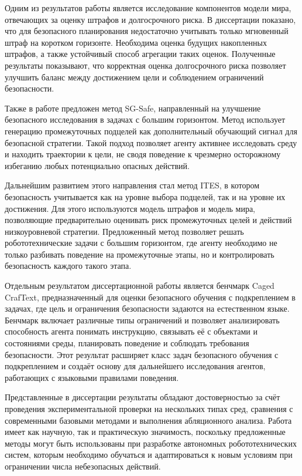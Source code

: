 \documentclass[a4paper,14pt]{extarticle}
\begin{document}
Одним из результатов работы является исследование компонентов модели мира, отвечающих за оценку штрафов и долгосрочного риска. В диссертации показано, что для безопасного планирования недостаточно учитывать только мгновенный штраф на коротком горизонте. Необходима оценка будущих накопленных штрафов, а также устойчивый способ агрегации таких оценок. Полученные результаты показывают, что корректная оценка долгосрочного риска позволяет улучшить баланс между достижением цели и соблюдением ограничений безопасности.

Также в работе предложен метод SG-Safe, направленный на улучшение безопасного исследования в задачах с большим горизонтом. Метод использует генерацию промежуточных подцелей как дополнительный обучающий сигнал для безопасной стратегии. Такой подход позволяет агенту активнее исследовать среду и находить траектории к цели, не сводя поведение к чрезмерно осторожному избеганию любых потенциально опасных действий.

Дальнейшим развитием этого направления стал метод ITES, в котором безопасность учитывается как на уровне выбора подцелей, так и на уровне их достижения. Для этого используются модель штрафов и модель мира, позволяющие предварительно оценивать риск промежуточных целей и действий низкоуровневой стратегии. Предложенный метод позволяет решать робототехнические задачи с большим горизонтом, где агенту необходимо не только разбивать поведение на промежуточные этапы, но и контролировать безопасность каждого такого этапа.

Отдельным результатом диссертационной работы является бенчмарк Caged CrafText, предназначенный для оценки безопасного обучения с подкреплением в задачах, где цель и ограничения безопасности задаются на естественном языке. Бенчмарк включает различные типы ограничений и позволяет анализировать способность агента понимать инструкцию, связывать её с объектами и состояниями среды, планировать поведение и соблюдать требования безопасности. Этот результат расширяет класс задач безопасного обучения с подкреплением и создаёт основу для дальнейшего исследования агентов, работающих с языковыми правилами поведения.

Представленные в диссертации результаты обладают достоверностью за счёт проведения экспериментальной проверки на нескольких типах сред, сравнения с современными базовыми методами и выполнения абляционного анализа. Работа имеет как научную, так и практическую значимость, поскольку предложенные методы могут быть использованы при разработке автономных робототехнических систем, которым необходимо обучаться и адаптироваться к новым условиям при ограничении числа небезопасных действий.
\end{document}
